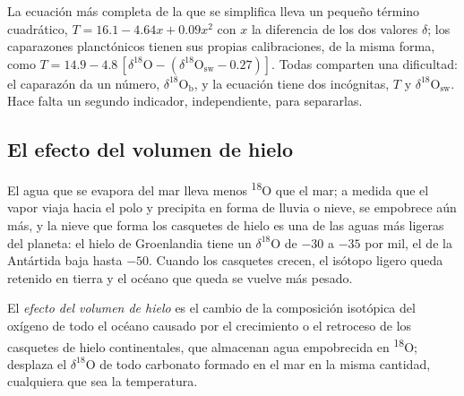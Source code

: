 La ecuación más completa de la que se simplifica lleva un pequeño término cuadrático,
$T = 16.1 - 4.64x + 0.09x^2$ con $x$ la diferencia de los dos valores $\delta$; los caparazones planctónicos
tienen sus propias calibraciones, de la misma forma, como $T = 14.9 - 4.8\,[\delta^{18}\mathrm{O} -
(\delta^{18}\mathrm{O}_{\mathrm{sw}} - 0.27)]$. Todas comparten una dificultad: el caparazón da un
número, $\delta^{18}\mathrm{O}_{\mathrm{b}}$, y la ecuación tiene dos incógnitas, $T$ y
$\delta^{18}\mathrm{O}_{\mathrm{sw}}$. Hace falta un segundo indicador, independiente, para separarlas.

\subsection*{El efecto del volumen de hielo}

El agua que se evapora del mar lleva menos \textsuperscript{18}O que el mar; a medida que el vapor
viaja hacia el polo y precipita en forma de lluvia o nieve, se empobrece aún más, y la nieve que forma los casquetes
de hielo es una de las aguas más ligeras del planeta: el hielo de Groenlandia tiene un $\delta^{18}$O de $-30$ a $-35$
por mil, el de la Antártida baja hasta $-50$. Cuando los casquetes crecen, el isótopo ligero queda retenido en tierra
y el océano que queda se vuelve más pesado.

\begin{definition}\label{def:b2:climate-proxies:ice-volume}
El \emph{efecto del volumen de hielo} es el cambio de la composición
isotópica del oxígeno de todo el océano causado por el crecimiento o el retroceso de los casquetes de hielo continentales, que
almacenan agua empobrecida en \textsuperscript{18}O; desplaza el $\delta^{18}$O de todo carbonato
formado en el mar en la misma cantidad, cualquiera que sea la temperatura.
\end{definition}

